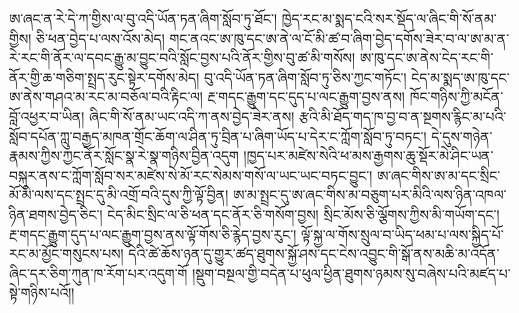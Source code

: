 \documentclass{article}
\begin{document}
ཨ་ཞང་ན་རེ་དེ་ཀ་གྱིས་ལ་བུ་འདི་ཡོན་ཏན་ཞིག་སློབ་ཏུ་ཐོང་། ཁྱེད་རང་མ་སྨད་ངའི་སར་སྡོད་ལ་ཞིང་གི་སོ་ནམ་གྱིས། ཅི་ཕན་བྱེད་པ་ལས་འོས་མེད། གང་ནའང་ཨ་ཁུ་དང་ཨ་ནེ་ལ་ངོ་མི་ཚ་བ་ཞིག་བྱེད་དགོས་ཟེར་བ་ལ་ཨ་མ་ན་རེ་རང་གི་ནོར་ལ་དབང་རྒྱུ་མ་བྱུང་བའི་སློང་བྱས་པའི་ནོར་གྱིས་བུ་ཚ་མི་གསོས། ཨ་ཁུ་དང་ཨ་ནེས་ངེད་རང་གི་ནོར་གྱི་ཆ་གཅིག་སྤྲད་རུང་སྟེར་དགོས་མེད། བུ་འདི་ཡོན་ཏན་ཞིག་སློབ་ཏུ་ཅིས་ཀྱང་གཏོང་། ངེད་མ་སྨད་ཨ་ཁུ་དང་ཨ་ནེས་གཤའ་མ་རང་མ་བཅོལ་བའི་རྟིང་ལ། རྔ་གདང་རྒྱུག་དང་དུད་པ་ལང་རྒྱུག་བྱས་ནས། ཁོང་གཉིས་ཀྱི་མངོན་བློ་འཕྱར་བ་ཡིན། ཞིང་གི་སོ་ནམ་ཡང་འདི་ཀ་ནས་བྱེད་ཟེར་ནས། རྩའི་མི་ཐོད་གད་ཁ་བྱ་བ་ན་སྔགས་རྙིང་མ་པའི་སློབ་དཔོན་ཀླུ་བརྒྱད་མཁན་གྲོང་ཆོག་ལ་ཤིན་ཏུ་བྲིན་པ་ཞིག་ཡོད་པ་དེར་ང་ཀློག་སློབ་ཏུ་བཏང་། དེ་དུས་གཉེན་རྣམས་ཀྱིས་ཀྱང་ནོར་སློང་སྣ་རེ་སྣ་གཉིས་བྱིན་འདུག །ཁྱད་པར་མཛེས་སེའི་ཕ་མས་རྒྱགས་ཆུ་སྡོར་མེ་ཤིང་ཡན་བསྐུར་ནས་ང་ཀློག་སློབ་སར་མཛེས་སེ་མོ་རང་སེམས་གསོ་ལ་ཡང་ཡང་བཏང་བྱུང་། ཨ་ཞང་གིས་ཨ་མ་དང་སྲིང་མོ་མི་ལས་དང་སྤྲང་དུ་མི་འགྲོ་བའི་དུས་ཀྱི་ལྟོ་བྱིན། ཨ་མ་སྤྲང་དུ་ཨ་ཞང་གིས་མ་བཅུག་པར་མིའི་ལས་ཉིན་འཁལ་ཉིན་ཐགས་བྱེད་ཅིང་། ངེད་མིང་སྲིང་ལ་ཅི་ཕན་དང་ནོར་ཅི་གསོག་བྱས། སྲིང་མོས་ཅི་ལྕོགས་ཀྱིས་མི་གཡོག་དང་། རྔ་གདང་རྒྱུག་དུད་པ་ལང་རྒྱུག་བྱས་ནས་ལྟོ་གོས་ཅི་རྙེད་བྱས་རུང་། ལྟོ་སྐྱ་ལ་གོས་སྲུལ་བ་ཡིད་ཕམ་པ་ལས་སྐྱིད་པོ་རང་མ་མྱོང་གསུངས་པས། དེའི་ཚེ་ཆོས་ཉན་དུ་གྱུར་ཚད་ཐུགས་སྐྱོ་ཤས་དང་ངེས་འབྱུང་གི་སྒོ་ནས་མཆི་མ་འདོན་ཞིང་དར་ཅིག་ཀུན་ཁ་རོག་པར་འདུག་གོ །སྡུག་བསྔལ་གྱི་བདེན་པ་ཕུལ་ཕྱིན་ཐུགས་ཉམས་སུ་བཞེས་པའི་མཛད་པ་སྟེ་གཉིས་པའོ།།
\end{document}
